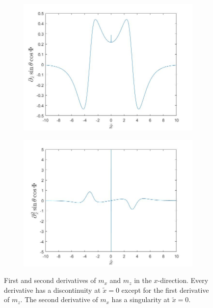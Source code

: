 \begin{figure}[h!]
\begin{subfigure}{.45\textwidth}
  \centering
  \includegraphics[width=\linewidth]{Figures/dSinThetaCosPhi.jpg}
  \caption{}
\end{subfigure}
\begin{subfigure}{.45\textwidth}
  \centering
  \includegraphics[width=\linewidth]{Figures/d2SinThetaCosPhi.jpg}
  \caption{}
\end{subfigure}
\caption{First and second derivatives of $m_x$ and $m_z$ in the $x$-direction. Every derivative has a discontinuity at $\tilde{x}=0$ except for the first derivative of $m_z$. The second derivative of $m_x$ has a singularity at $\tilde{x}=0$.}
\label{fig:SkyrmionDerivatives}
\end{figure}
